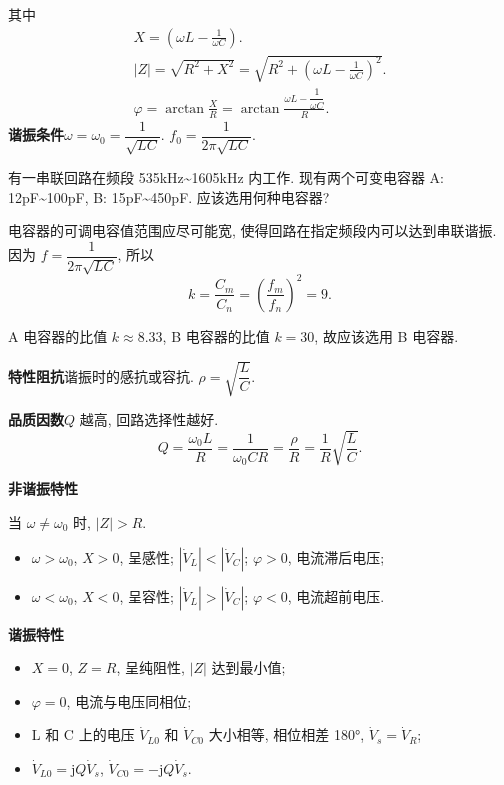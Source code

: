 其中
\srmg
\begin{gather}
    X=\left(\omega L-\frac{1}{\omega C}\right). \\
    |Z|=\sqrt{R^2+X^2}=\sqrt{R^2+\left(\omega L-\frac{1}{\omega C}\right)^2}. \\
    \varphi=\arctan\frac{X}{R}=\arctan\frac{\omega L-\dfrac{1}{\omega C}}{R}.
\end{gather}
\rmg
\phantom{占位}\textbf{谐振条件}\quad $\omega=\omega_0=\dfrac{1}{\sqrt{LC}}$. $f_0=\dfrac{1}{2\pi\sqrt{LC}}$.

\begin{exampleprob}
    有一串联回路在频段 535kHz\textasciitilde 1605kHz 内工作. 现有两个可变电容器 A: 12pF\textasciitilde 100pF, B: 15pF\textasciitilde 450pF. 应该选用何种电容器?

    \begin{solution}
        电容器的可调电容值范围应尽可能宽, 使得回路在指定频段内可以达到串联谐振. 因为 $f=\dfrac{1}{2\pi\sqrt{LC}}$, 所以
        \begin{equation*}
            k=\frac{C_m}{C_n}=\left(\frac{f_m}{f_n}\right)^2=9.
        \end{equation*}

        A 电容器的比值 $k\approx 8.33$, B 电容器的比值 $k=30$, 故应该选用 B 电容器.
    \end{solution}
\end{exampleprob}

\textbf{特性阻抗}\quad 谐振时的感抗或容抗. $\rho=\sqrt{\dfrac{L}{C}}$.

\textbf{品质因数}\quad $Q$ 越高, 回路选择性越好.
\begin{equation}
    Q=\frac{\omega_0L}{R}=\frac{1}{\omega_0CR}=\frac{\rho}{R}=\frac{1}{R}\sqrt{\dfrac{L}{C}}.
\end{equation}

\textbf{非谐振特性}

当 $\omega\neq\omega_0$ 时, $|Z|>R$.

\begin{itemize}
    \item $\omega>\omega_0$, $X>0$, 呈感性; $|\dot{V}_L|<|\dot{V}_C|$; $\varphi>0$, 电流滞后电压;
    \item $\omega<\omega_0$, $X<0$, 呈容性; $|\dot{V}_L|>|\dot{V}_C|$; $\varphi<0$, 电流超前电压.
\end{itemize}

\textbf{谐振特性}

\begin{itemize}
    \item $X=0$, $Z=R$, 呈纯阻性, $|Z|$ 达到最小值;
    \item $\varphi=0$, 电流与电压同相位;
    \item L 和 C 上的电压 $\dot{V}_{L0}$ 和 $\dot{V}_{C0}$ 大小相等, 相位相差 180°, $\dot{V}_s=\dot{V}_R$;
    \item $\dot{V}_{L0}=\mathrm{j}Q\dot{V}_s$, $\dot{V}_{C0}=-\mathrm{j}Q\dot{V}_s$.
\end{itemize}

